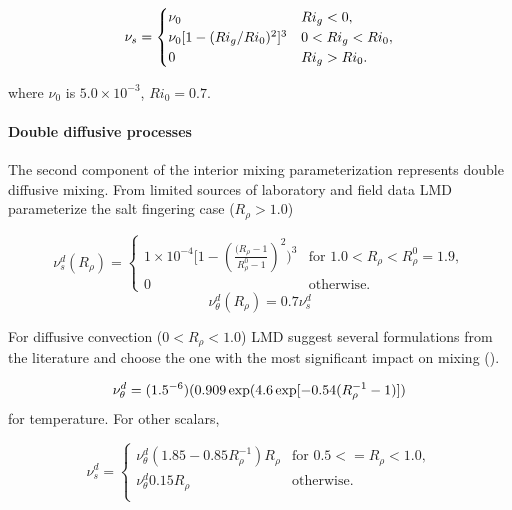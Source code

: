 \begin{equation}
\nu_s=\begin{cases}
\nu_0&   \text{$ Ri_g<0$}, \\
\nu_0[1-(Ri_g/Ri_0)^2]^3&  \text{$0< Ri_g<Ri_0$},  \\
0&   \text{$Ri_g>Ri_0$}.  
\end{cases}
\end{equation}

where $\nu_0$ is $5.0 \times 10^{-3}$, $Ri_0 = 0.7$.  

\paragraph{Double diffusive processes}
The second component of the interior mixing parameterization represents
double diffusive mixing.  From limited sources of laboratory and field
data LMD parameterize the salt fingering case ($R_{\rho}>1.0$)

\begin{equation}
\nu_{s}^{d}(R_{\rho})=
	\begin{cases}
1\times10^{-4}[1-(\frac{(R_{\rho}-1}{R_{\rho}^0-1})^2)^{3}&   \text{for $1.0<R_{\rho}<R_{\rho}^0=1.9$},\\
           0& \text{otherwise}.
        \end{cases}
\end{equation}
\begin{equation}
\nu_{\theta}^{d}(R_{\rho})=0.7\nu_{s}^{d}
\end{equation}

For diffusive convection ($0<R_{\rho}<1.0$) LMD suggest several
formulations from the literature and choose the one with the most
significant impact on mixing (\cite{Fedorov88}).

\begin{equation}
\nu_{\theta}^{d}=(1.5 \time 10^{-6})(0.909 \exp(4.6 \exp[-0.54(R_{\rho}^{-1}-1)])
\end{equation}
for temperature.  For other scalars,

\begin{equation}
   \nu_{s}^{d}=
	\begin{cases}
	     \nu_{\theta}^{d}(1.85-0.85R_{\rho}^{-1})R_{\rho}& \text{for $0.5<=R_{\rho}<1.0$},\\ 
             \nu_{\theta}^{d}0.15R_{\rho}&  \text{otherwise}. \\
        \end{cases}
\end{equation}

